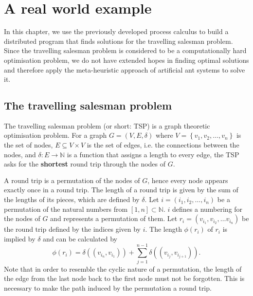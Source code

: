 \chapter{A real world example}
In this chapter, we use the previously developed process calculus to build a distributed program that finds solutions for the travelling salesman problem. Since the travelling salesman problem is considered to be a computationally hard optimisation problem, we do not have extended hopes in finding optimal solutions and therefore apply the meta-heuristic approach of artificial ant systems to solve it.

\section{The travelling salesman problem}
\label{chp:tsp}
The travelling salesman problem (or short: \textsc{TSP}) is a graph theoretic optimisation problem. For a graph $G = \left( V, E, \delta \right)$ where $V = \left\{ v_1, v_2, \ldots, v_n \right\}$ is the set of nodes, $E \subseteq V \times V$ is the set of edges, i.e. the connections between the nodes, and $\delta \colon E \to \mathbb{N}$ is a function that assigns a length to every edge, the \textsc{TSP} asks for the \textbf{shortest} round trip through the nodes of $G$.



A round trip is a permutation of the nodes of $G$, hence every node appears exactly once in a round trip. The length of a round trip is given by the sum of the lengths of its pieces, which are defined by $\delta$. Let $i = \left( i_1, i_2, \ldots, i_n \right)$ be a permutation of the natural numbers from $[1, n] \subset \mathbb{N}$. $i$ defines a numbering for the nodes of $G$ and represents a permutation of them. Let $r_i = \left( v_{i_1}, v_{i_2}, \ldots v_{i_n} \right)$ be the round trip defined by the indices given by $i$. The length $\phi \left( r_i \right)$ of $r_i$ is implied by $\delta$ and can be calculated by
\begin{equation*}
  \label{eqn:length_roundtrip}
  \phi \left( r_i \right) = \delta \left( \left( v_{i_n}, v_{i_1} \right) \right) + \sum_{j=1}^{n-1} \delta \left( \left( v_{i_j}, v_{i_{j+1}} \right) \right).
\end{equation*}
Note that in order to resemble the cyclic nature of a permutation, the length of the edge from the last node back to the first node must not be forgotten. This is necessary to make the path induced by the permutation a round trip.

